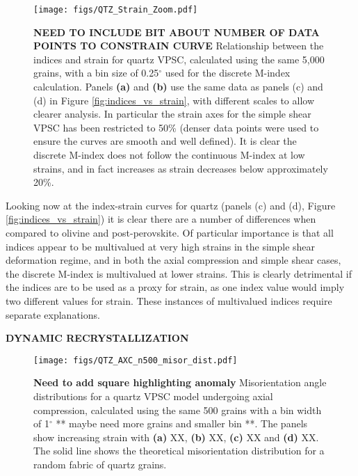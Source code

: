 \documentclass[a4paper,12pt,twoside]{report}
\numberwithin{equation}{chapter}
\begin{document}
\begin{figure}[h]
  \centering
    \texttt{[image: figs/QTZ\_Strain\_Zoom.pdf]}
  \caption[Relation of indices to strain (quartz VPSC)]{\textbf{NEED TO INCLUDE BIT ABOUT NUMBER OF DATA POINTS TO CONSTRAIN CURVE} Relationship between the indices and strain for quartz VPSC, calculated using the same 5,000 grains, with a bin size of 0.25$^\circ$ used for the discrete M-index calculation. Panels \textbf{(a)} and \textbf{(b)} use the same data as panels (c) and (d) in Figure \ref{fig:indices_vs_strain}, with different scales to allow clearer analysis. In particular the strain axes for the simple shear VPSC has been restricted to 50\% (denser data points were used to ensure the curves are smooth and well defined). It is clear the discrete M-index does not follow the continuous M-index at low strains, and in fact increases as strain decreases below approximately 20\%.}
  \label{fig:indices_vs_strain_qtz}
\end{figure} 

Looking now at the index-strain curves for quartz (panels (c) and (d), Figure \ref{fig:indices_vs_strain}) it is clear there are a number of differences when compared to olivine and post-perovskite. Of particular importance is that all indices appear to be multivalued at very high strains in the simple shear deformation regime, and in both the axial compression and simple shear cases, the discrete M-index is multivalued at lower strains. This is clearly detrimental if the indices are to be used as a proxy for strain, as one index value would imply two different values for strain. These instances of multivalued indices require separate explanations.

\textbf{DYNAMIC RECRYSTALLIZATION}


\begin{figure}[h]
  \centering
    \texttt{[image: figs/QTZ\_AXC\_n500\_misor\_dist.pdf]}
  \caption[Misorientation angle distribution (quartz VPSC)]{\textbf{Need to add square highlighting anomaly} Misorientation angle distributions for a quartz VPSC model undergoing axial compression, calculated using the same 500 grains with a bin width of 1$^{\circ}$ ** maybe need more grains and smaller bin **. The panels show increasing strain with \textbf{(a)} XX, \textbf{(b)} XX, \textbf{(c)} XX and \textbf{(d)} XX. The solid line shows the theoretical misorientation distribution for a random fabric of quartz grains.} 
  \label{fig:qtz_misorientation_dist}
\end{figure} 
\end{document}
